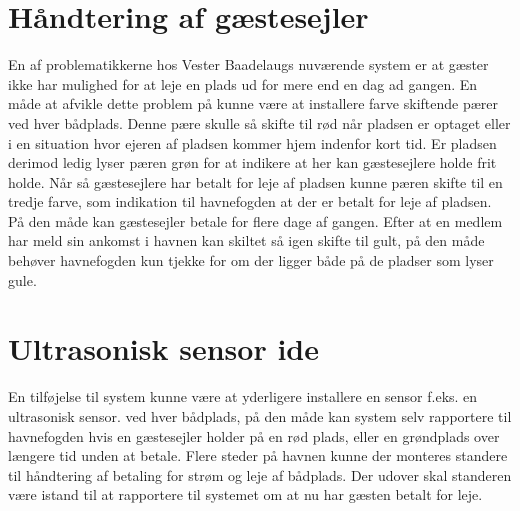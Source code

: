 
\section{Håndtering af gæstesejler}
\label{sub:h_ndtering_af_g_stesejler}
En af problematikkerne hos Vester Baadelaugs nuværende system er at gæster ikke har mulighed for at leje en plads ud for mere end en dag ad gangen. 
En måde at afvikle dette problem på kunne være at installere farve skiftende pærer ved hver bådplads. Denne pære skulle så skifte til rød når pladsen er optaget eller i en situation hvor ejeren af pladsen kommer hjem indenfor kort tid. Er pladsen derimod ledig lyser pæren grøn for at indikere at her kan gæstesejlere holde frit holde. 
Når så gæstesejlere har betalt for leje af pladsen kunne pæren skifte til en tredje farve, som indikation til havnefogden at der er betalt for leje af pladsen. På den måde kan gæstesejler betale for flere dage af gangen. Efter at en medlem har meld sin ankomst i havnen kan skiltet så igen skifte til gult, på den måde behøver havnefogden kun tjekke for om der ligger både på de pladser som lyser gule. 


\section{Ultrasonisk sensor ide} %
\label{sec:Ultrasonisk_ide}

En tilføjelse til system kunne være at yderligere installere en sensor f.eks. en ultrasonisk sensor. ved hver bådplads, på den måde kan system selv rapportere til havnefogden hvis en gæstesejler holder på en rød plads, eller en grøndplads over længere tid unden at betale.
Flere steder på havnen kunne der monteres standere til håndtering af betaling for strøm og leje af bådplads. Der udover skal standeren være istand til at rapportere til systemet om at nu har gæsten betalt for leje.

